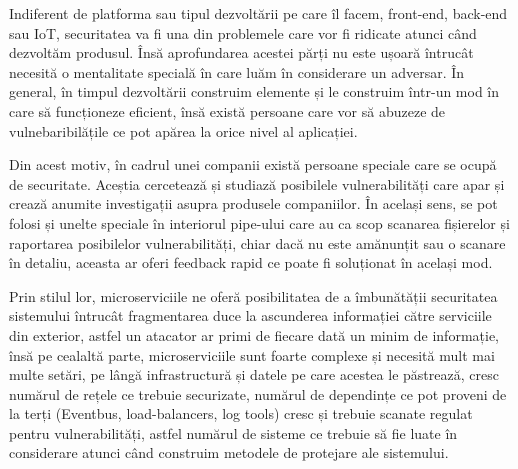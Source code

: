 Indiferent de platforma sau tipul dezvoltării pe care îl facem, front-end, back-end sau IoT,  
securitatea va fi una din problemele care vor fi ridicate atunci când dezvoltăm produsul.
Însă aprofundarea acestei părți nu este ușoară întrucât necesită o mentalitate specială în 
care luăm în considerare un adversar. În general, în timpul dezvoltării construim elemente 
și le construim într-un mod în care să funcționeze eficient, însă există persoane care 
vor să abuzeze de vulnebaribilățile ce pot apărea la orice nivel al aplicației.

Din acest motiv, în cadrul unei companii există persoane speciale care se ocupă de securitate.
Aceștia cercetează și studiază posibilele vulnerabilități care apar și crează anumite investigații
asupra produsele companiilor. În același sens, se pot folosi și unelte speciale în interiorul pipe-ului
care au ca scop scanarea fișierelor și raportarea posibilelor vulnerabilități, chiar dacă nu este amănunțit
sau o scanare în detaliu, aceasta ar oferi feedback rapid ce poate fi soluționat în același mod.

Prin stilul lor, microserviciile ne oferă posibilitatea de a îmbunătății securitatea sistemului
întrucât fragmentarea duce la ascunderea informației către serviciile din exterior, astfel un
atacator ar primi de fiecare dată un minim de informație, însă pe cealaltă parte, microserviciile sunt
foarte complexe și necesită mult mai multe setări, pe lângă infrastructură și datele pe care 
acestea le păstrează, cresc numărul de rețele ce trebuie securizate, numărul de dependințe
ce pot proveni de la terți (Eventbus, load-balancers, log tools) cresc și trebuie scanate
regulat pentru vulnerabilități, astfel numărul de sisteme ce trebuie să fie luate în considerare 
atunci când construim metodele de protejare ale sistemului.

